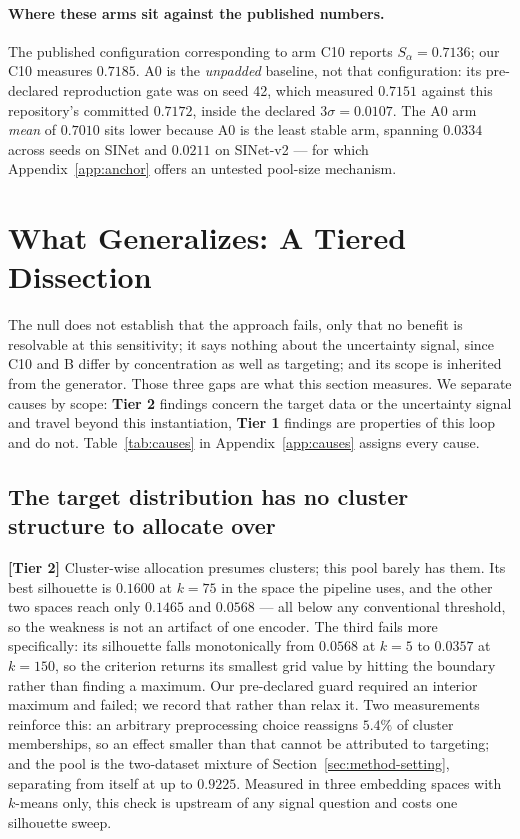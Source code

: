 \documentclass{article} %
\begin{document}
\paragraph{Where these arms sit against the published numbers.} The published configuration
corresponding to arm C10 reports $S_\alpha = 0.7136$; our C10 measures $0.7185$. A0 is the
\emph{unpadded} baseline, not that configuration: its pre-declared reproduction gate was on seed 42,
which measured $0.7151$ against this repository's committed $0.7172$, inside the declared
$3\sigma = 0.0107$. The A0 arm \emph{mean} of $0.7010$ sits lower because A0 is the least stable arm,
spanning $0.0334$ across seeds on SINet and $0.0211$ on SINet-v2 --- for which
Appendix~\ref{app:anchor} offers an untested pool-size mechanism.

\section{What Generalizes: A Tiered Dissection}
\label{sec:dissection}

The null does not establish that the approach fails, only that no benefit is resolvable at this
sensitivity; it says nothing about the uncertainty signal, since C10 and B differ by concentration as
well as targeting; and its scope is inherited from the generator. Those three gaps are what this
section measures. We separate causes by scope: \textbf{Tier 2} findings concern the target data or the
uncertainty signal and travel beyond this instantiation, \textbf{Tier 1} findings are properties of
this loop and do not. Table~\ref{tab:causes} in Appendix~\ref{app:causes} assigns every cause.

\subsection{The target distribution has no cluster structure to allocate over}
\label{sec:diss-structure}

\textbf{[Tier 2]} Cluster-wise allocation presumes clusters; this pool barely has them. Its best
silhouette is $0.1600$ at $k = 75$ in the space the pipeline uses, and the other two spaces reach only
$0.1465$ and $0.0568$ --- all below any conventional threshold, so the weakness is not an artifact of
one encoder. The third fails more specifically: its silhouette falls monotonically from $0.0568$ at
$k=5$ to $0.0357$ at $k=150$, so the criterion returns its smallest grid value by hitting the boundary
rather than finding a maximum. Our pre-declared guard required an interior maximum and failed; we
record that rather than relax it. Two measurements reinforce this: an arbitrary preprocessing
choice reassigns $5.4\%$ of cluster memberships, so an effect smaller than that cannot be attributed
to targeting; and the pool is the two-dataset mixture of Section~\ref{sec:method-setting}, separating
from itself at up to $0.9225$. Measured in three embedding spaces with $k$-means only, this check is
upstream of any signal question and costs one silhouette sweep.
\end{document}
